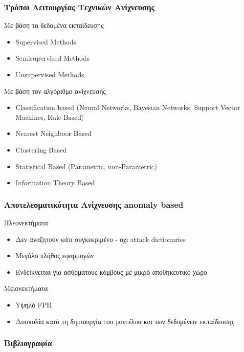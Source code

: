 \documentclass[handouts,hyperref={pdfpagelabels=false}]{beamer}
\begin{document}
\begin{frame}
\frametitle{\foreignlanguage{greek}{Τρόποι Λειτουργίας Τεχνικών Ανίχνευσης}}
\begin{block}{Με βάση τα δεδομένα εκπαίδευσης}
\begin{itemize}
    \item \textlatin{Supervised Methods}
    \item \textlatin{Semisupervised Methods}
    \item \textlatin{Unsupervised Methods}
\end{itemize}
\end{block}

\begin{block}{Με βάση τον αλγόριθμο ανίχνευσης}
\begin{itemize}
    \item \textlatin{Classification based (Neural Networks, Bayesian Networks, Support Vector Machines, Rule-Based)}
    \item \textlatin{Nearest Neighboor Based}
    \item \textlatin{Clustering Based}
    \item \textlatin{Statistical Based (Parametric, non-Parametric)}
    \item \textlatin{Information Theory Based}
\end{itemize}
\end{block}
\end{frame}

\begin{frame}
\frametitle{\foreignlanguage{greek}{Αποτελεσματικότητα Ανίχνευσης \textlatin{anomaly based}}}
\begin{block}{Πλεονεκτήματα}
\begin{itemize}
    \item Δεν αναζητούν κάτι συγκεκριμένο - οχι \textlatin{attack dictionaries}
    \item Μεγάλο πλήθος εφαρμογών
    \item Ενδείκνειται για ασύρματους κόμβους με μικρό αποθηκευτικό χώρο
\end{itemize}
\end{block}

\begin{block}{Μειονεκτήματα}
\begin{itemize}
    \item Yψηλό \textlatin{FPR}
    \item Δυσκολία κατά τη δημιουργία του μοντέλου και των δεδομένων εκπαίδευσης
\end{itemize}
\end{block}
\end{frame}

\begin{frame}[allowframebreaks]
\frametitle{\foreignlanguage{greek}{Βιβλιογραφία}}
\nocite{*}


\end{frame}
\end{document}
